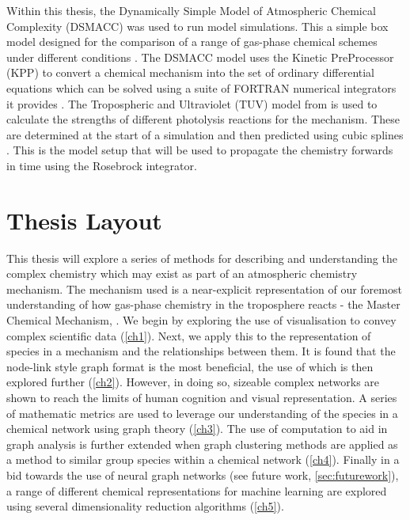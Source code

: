 Within this thesis, the Dynamically Simple Model of Atmospheric Chemical Complexity (DSMACC) was used to run model simulations. This a simple box model designed for the comparison of a range of gas-phase chemical schemes under different conditions \citep{dsmacc}.
 The DSMACC model uses the Kinetic PreProcessor (KPP) to convert a chemical mechanism into the set of ordinary differential equations which can be solved using a suite of FORTRAN numerical integrators it provides \citep{kpp}. The Tropospheric and Ultraviolet (TUV) model from \cite{tuv} is used to calculate the strengths of different photolysis reactions for the mechanism. These are determined at the start of a simulation and then predicted using cubic splines \citep{dsmaccgit}. This is the model setup that will be used to propagate the chemistry forwards in time using the Rosebrock integrator.

\section{Thesis Layout}
This thesis will explore a series of methods for describing and understanding the complex chemistry which may exist as part of an atmospheric chemistry mechanism. The mechanism used is a near-explicit representation of our foremost understanding of how gas-phase chemistry in the troposphere reacts - the Master Chemical Mechanism, \citep{mcm}.
We begin by exploring the use of visualisation to convey complex scientific data (\autoref{ch1}). Next, we apply this to the representation of species in a mechanism and the relationships between them. It is found that the node-link style graph format is the most beneficial, the use of which is then explored further (\autoref{ch2}).
However, in doing so, sizeable complex networks are shown to reach the limits of human cognition and visual representation. A series of mathematic metrics are used to leverage our understanding of the species in a chemical network using graph theory (\autoref{ch3}). The use of computation to aid in graph analysis is further extended when graph clustering methods are applied as a method to similar group species within a chemical network (\autoref{ch4}). Finally in a bid towards the use of neural graph networks (see future work, \autoref{sec:futurework}), a range of different chemical representations for machine learning are explored using several dimensionality reduction algorithms (\autoref{ch5}).
